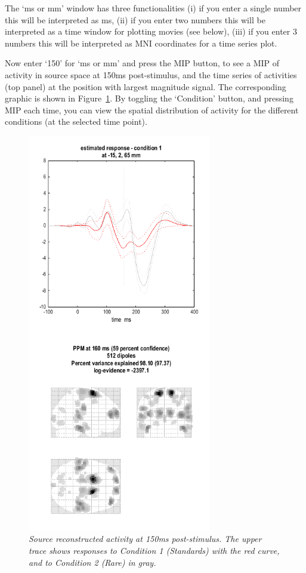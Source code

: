  The `ms or mm' window has three functionalities (i) if you enter a single number this will be interpreted as ms, (ii) if you enter two numbers this will be interpreted as a time window for plotting movies (see below), (iii) if you enter 3 numbers this will be interpreted as MNI coordinates for a time series plot.

 Now enter `150' for `ms or mm' and press the MIP button, to see a
 MIP of activity in source space at 150ms post-stimulus, and the time series of activities (top panel) at the position with largest magnitude signal. The corresponding graphic is shown in Figure~\ref{invert}. By toggling the `Condition' button, and pressing MIP each time, you can view the spatial distribution of activity for the different conditions (at the selected time point).
\begin{figure}
\begin{center}
\includegraphics[width=80mm]{mmn/invert}
\caption{\em Source reconstructed activity at 150ms post-stimulus.
The upper trace shows responses to Condition 1 (Standards) with the red curve, and to Condition 2 (Rare) in gray.
\label{invert}}
\end{center}
\end{figure}

